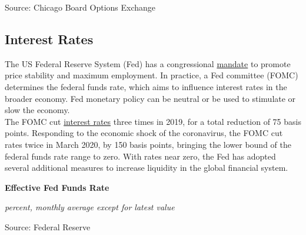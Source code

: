 \documentclass{report}
\makeatletter
\newcommand{\tbllink}[1]{\href{https://raw.githubusercontent.com/bdecon/US-chartbook/master/chartbook/data/#1}{\faTable}}
\newcommand*\short[1]{\expandafter\@gobbletwo\number\numexpr#1\relax}
\newcommand{\dateaxisticks}{
		date coordinates in=x, axis line style={draw=none},
		xmax={2020-08-10},
		max space between ticks=40,	    
		xtick={{1990-01-01}, {1992-01-01}, {1994-01-01}, 
			{1996-01-01}, {1998-01-01}, {2000-01-01}, 
			{2002-01-01}, {2004-01-01}, {2006-01-01},
			{2008-01-01}, {2010-01-01}, {2012-01-01}, {2014-01-01},
		    {2016-01-01}, {2018-01-01}, {2020-01-01}},
		minor xtick={{1989-01-01}, {1991-01-01}, {1993-01-01},
			{1995-01-01}, {1997-01-01}, {1999-01-01}, 
			{2001-01-01}, {2003-01-01}, {2005-01-01}, {2007-01-01},
		    {2009-01-01}, {2011-01-01}, {2013-01-01}, {2015-01-01},
		    {2017-01-01}, {2019-01-01}},
		enlarge y limits={0.06}, enlarge x limits={0.01},
		}
\newcommand{\bbar}[2]{extra #1 ticks = {{#2}}, extra #1 tick labels = ,
		extra #1 tick style = {grid=major, grid style={thick, black!25}},}
\newcommand{\stdline}[4]{\addplot[very thick, no markers, color=#1] 
		table [x=#2, y=#3, col sep=comma] {#4};	}
\newcommand{\rbars}{
		\fill[color=black!10] (axis cs:{1990-07-01},\pgfkeysvalueof{/pgfplots/ymin}) rectangle 
			(axis cs:{1991-03-01}, \pgfkeysvalueof{/pgfplots/ymax});
		\fill[color=black!10] (axis cs:{2007-12-01},\pgfkeysvalueof{/pgfplots/ymin}) rectangle 
			(axis cs:{2009-07-01}, \pgfkeysvalueof{/pgfplots/ymax});
		\fill[color=black!10] (axis cs:{2001-03-01},\pgfkeysvalueof{/pgfplots/ymin}) rectangle 
			(axis cs:{2001-11-01}, \pgfkeysvalueof{/pgfplots/ymax});
		\fill[color=black!10] (axis cs:{2020-02-01},\pgfkeysvalueof{/pgfplots/ymin}) rectangle 
			(axis cs:{2020-09-01}, \pgfkeysvalueof{/pgfplots/ymax});}
\makeatother
\begin{document}
{{{{{{{{{\begin{minipage}{0.76\textwidth}
\footnotesize{Source: Chicago Board Options Exchange} \hfill \tbllink{vix.csv}
\end{minipage}

\newpage

\begin{minipage}{0.76\textwidth}

\subsection*{\color{black!70} \seriffont Interest Rates}

\small The US Federal Reserve System (Fed) has a congressional \href{https://www.federalreserve.gov/faqs/money_12848.htm}{mandate} to promote price stability and maximum employment. In practice, a Fed committee (FOMC) determines the federal funds rate, which aims to influence interest rates in the broader economy. Fed monetary policy can be neutral or be used to stimulate or slow the economy.\\

The FOMC cut \href{https://www.federalreserve.gov/releases/h15/}{interest rates} three times in 2019, for a total reduction of 75 basis points. Responding to the economic shock of the coronavirus, the FOMC cut rates twice in March 2020, by 150 basis points, bringing the lower bound of the federal funds rate range to zero. With rates near zero, the Fed has adopted several additional measures to increase liquidity in the global financial system.

\vspace{4mm}

\normalsize \textbf{Effective Fed Funds Rate}

\footnotesize{\textit{percent, monthly average except for latest value }}
 
\hspace*{-2mm} 

\footnotesize{Source: Federal Reserve} \hfill \tbllink{rates.csv}

\end{minipage}

\newpage

}}}}}}}}}
\end{document}
